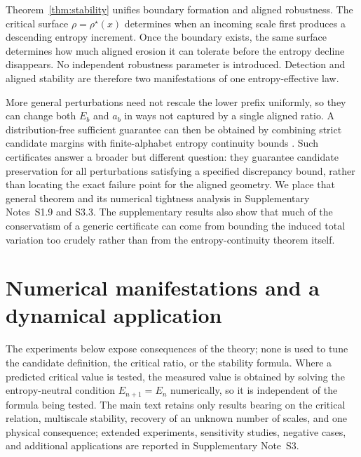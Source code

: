 \documentclass[aip,cha,reprint,superscriptaddress,floatfix]{revtex4-2}
\theoremstyle{definition}
\theoremstyle{remark}
\newcommand{\rhostar}{\rho^{\star}}
\begin{document}
Theorem~\ref{thm:stability} unifies boundary formation and aligned robustness. The critical surface \(\rho=\rhostar(x)\) determines when an incoming scale first produces a descending entropy increment. Once the boundary exists, the same surface determines how much aligned erosion it can tolerate before the entropy decline disappears. No independent robustness parameter is introduced. Detection and aligned stability are therefore two manifestations of one entropy-effective law.

More general perturbations need not rescale the lower prefix uniformly, so they can change both \(E_b\) and \(a_b\) in ways not captured by a single aligned ratio. A distribution-free sufficient guarantee can then be obtained by combining strict candidate margins with finite-alphabet entropy continuity bounds \cite{fannes1973,audenaert2007}. Such certificates answer a broader but different question: they guarantee candidate preservation for all perturbations satisfying a specified discrepancy bound, rather than locating the exact failure point for the aligned geometry. We place that general theorem and its numerical tightness analysis in Supplementary Notes~S1.9 and S3.3. The supplementary results also show that much of the conservatism of a generic certificate can come from bounding the induced total variation too crudely rather than from the entropy-continuity theorem itself.

\section{Numerical manifestations and a dynamical application}
\label{sec:results}


The experiments below expose consequences of the theory; none is used to tune the candidate definition, the critical ratio, or the stability formula. Where a predicted critical value is tested, the measured value is obtained by solving the entropy-neutral condition \(E_{n+1}=E_n\) numerically, so it is independent of the formula being tested. The main text retains only results bearing on the
critical relation, multiscale stability, recovery of an unknown number of scales, and one physical consequence; extended experiments, sensitivity studies, negative cases, and additional applications are reported in Supplementary Note~S3.
\end{document}
